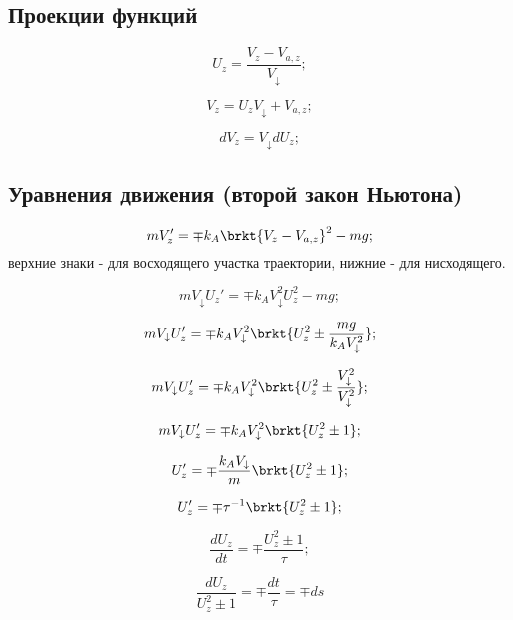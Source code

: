 \subsection{Проекции функций}
$$U_z = \frac{V_z - V_{a,z}}{V_\downarrow};$$

$$V_z = U_z V_\downarrow + V_{a,z};$$

$$dV_z = V_\downarrow dU_z;$$

\subsection{Уравнения движения (второй закон Ньютона)}
$$mV_{z}' = \mp k_A \brkt{ V_z - V_{a,z} } ^2 - mg;$$
верхние знаки - для восходящего участка траектории, нижние - для нисходящего.

$$mV_{\downarrow}U_{z}' = \mp k_A V_{\downarrow}^2 U_{z}^2 - mg;$$

$$mV_{\downarrow}U_{z}' = \mp k_A V_{\downarrow}^2 \brkt{ U_{z}^2 \pm \frac{mg}{k_A V_{\downarrow}^2} };$$

$$mV_{\downarrow}U_{z}' = \mp k_A V_{\downarrow}^2 \brkt{ U_{z}^2 \pm \frac{V_{\downarrow}^2}{V_{\downarrow}^2} };$$

$$mV_{\downarrow}U_{z}' = \mp k_A V_{\downarrow}^2 \brkt{ U_{z}^2 \pm 1 };$$

$$U_{z}' = \mp \frac{k_A V_{\downarrow}}{m}  \brkt{ U_{z}^2 \pm 1 };$$

$$U_{z}' = \mp \tau^{-1}  \brkt{ U_{z}^2 \pm 1 };$$

$$\frac{dU_z}{dt} = \mp \frac{ U_{z}^2 \pm 1}{\tau};$$

$$\boxed{
	\frac{dU_z}{ U_{z}^2 \pm 1} = \mp \frac{dt}{\tau} = \mp ds
}$$